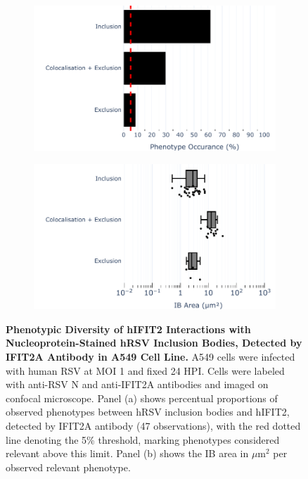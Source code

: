 \begin{figure}
    \begin{subfigure}{0.495\textwidth}
        \caption{}
        \includegraphics[width=1\linewidth]{08. Chapter 3/Figs/02. Infection/02. IFIT2/01. IFIT2A/01. bar_i2a_a549-n.pdf}
    \end{subfigure}
    \begin{subfigure}{0.495\textwidth}
        \caption{}
        \includegraphics[width=1\linewidth]{08. Chapter 3/Figs/02. Infection/02. IFIT2/01. IFIT2A/02. box_i2a_a549-n.pdf}
    \end{subfigure}
    \caption[Phenotypic Diversity of hIFIT2 Interactions with Nucleoprotein-Stained hRSV Inclusion Bodies, Detected by IFIT2A Antibody in A549 Cell Line.]{\textbf{Phenotypic Diversity of hIFIT2 Interactions with Nucleoprotein-Stained hRSV Inclusion Bodies, Detected by IFIT2A Antibody in A549 Cell Line.} A549 cells were infected with human RSV at MOI 1 and fixed 24 HPI. Cells were labeled with anti-RSV N and anti-IFIT2A antibodies and imaged on confocal microscope. Panel (a) shows percentual proportions of observed phenotypes between hRSV inclusion bodies and hIFIT2, detected by IFIT2A antibody (47 observations), with the red dotted line denoting the 5\% threshold, marking phenotypes considered relevant above this limit. Panel (b) shows the IB area in \(\mu \mbox{m}^2\) per observed relevant phenotype.}
    \label{fig:Phenotypic Diversity of hIFIT2 Interactions with Nucleoprotein-Stained hRSV Inclusion Bodies, Detected by IFIT2A Antibody in A549 Cell Line}
\end{figure}

